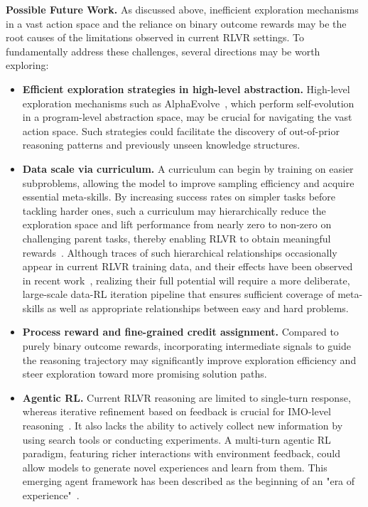 \textbf{Possible Future Work.} As discussed above, inefficient exploration mechanisms in a vast action space and the reliance on binary outcome rewards may be the root causes of the limitations observed in current RLVR settings. To fundamentally address these challenges, several directions may be worth exploring:

\vspace{-1.0mm}
\begin{itemize}
\item \textbf{Efficient exploration strategies in high-level abstraction.} High-level exploration mechanisms such as AlphaEvolve~\cite{novikov2025alphaevolve}, which perform self-evolution in a program-level abstraction space, may be crucial for navigating the vast action space. Such strategies could facilitate the discovery of out-of-prior reasoning patterns and previously unseen knowledge structures.

\item \textbf{Data scale via curriculum.} A curriculum can begin by training on easier subproblems, allowing the model to improve sampling efficiency and acquire essential meta-skills. By increasing success rates on simpler tasks before tackling harder ones, such a curriculum may hierarchically reduce the exploration space and lift performance from nearly zero to non-zero on challenging parent tasks, thereby enabling RLVR to obtain meaningful rewards~\cite{zhang2025stephint,li2025questa}. Although traces of such hierarchical relationships occasionally appear in current RLVR training data, and their effects have been observed in recent work~\cite{chen2025acereason}, realizing their full potential will require a more deliberate, large-scale data-RL iteration pipeline that ensures sufficient coverage of meta-skills as well as appropriate relationships between easy and hard problems.

\item \textbf{Process reward and fine-grained credit assignment.} Compared to purely binary outcome rewards, incorporating intermediate signals to guide the reasoning trajectory may significantly improve exploration efficiency and steer exploration toward more promising solution paths.

\item \textbf{Agentic RL.} Current RLVR reasoning are limited to single-turn response, whereas iterative refinement based on feedback is crucial for IMO-level reasoning~\cite{huang2025winning}. It also lacks the ability to actively collect new information by using search tools or conducting experiments. A multi-turn agentic RL paradigm, featuring richer interactions with environment feedback, could allow models to generate novel experiences and learn from them. This emerging agent framework has been described as the beginning of an "era of experience"~\cite{silver2025welcome}.


\end{itemize}

